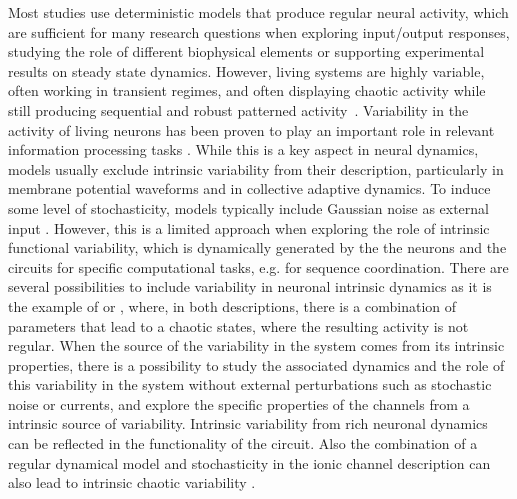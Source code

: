 Most studies use deterministic models that produce regular neural activity, which are sufficient for many research questions when exploring input/output responses, studying the role of different biophysical elements or supporting experimental results on steady state dynamics. However, living systems are highly variable, often working in transient regimes, and often displaying chaotic activity while still producing sequential and robust patterned activity~\parencite{selverston_reliable_2000}. Variability in the activity of living neurons has been proven to play an important role in relevant information processing tasks \parencite{ding_dynamic_2011,renart_variability_2014,masquelier_neural_2013,hutt_intrinsic_2023,ribeiro_trialbytrial_2024}. While this is a key aspect in neural dynamics, models usually exclude intrinsic variability from their description,  particularly in membrane potential waveforms and in collective adaptive dynamics. To induce some level of stochasticity, models typically include Gaussian noise as external input \parencite{linaro_accurate_2011,pezo_diffusion_2014,zheng_spontaneous_2020}. However, this is a limited approach when exploring the role of intrinsic functional variability, which is dynamically generated by the the neurons and the circuits for specific computational tasks, e.g. for sequence coordination. There are several possibilities to include variability in neuronal intrinsic dynamics as it is the example of \textcite{hindmarsh_model_1984} or \textcite{komendantov_deterministic_1996}, where, in both descriptions, there is a combination of parameters that lead  to a chaotic states, where the resulting activity is not regular. When the source of the variability in the system comes from its intrinsic properties, there is a possibility to study the associated dynamics and the role of this variability in the system without external perturbations such as stochastic noise or currents, and explore the specific properties of the channels from a intrinsic source of variability. Intrinsic variability from rich neuronal dynamics can be reflected in the functionality of the circuit. Also the combination of a regular dynamical model and stochasticity in the ionic channel description can also lead to intrinsic chaotic variability \parencite{carelli_whole_2005}. 

